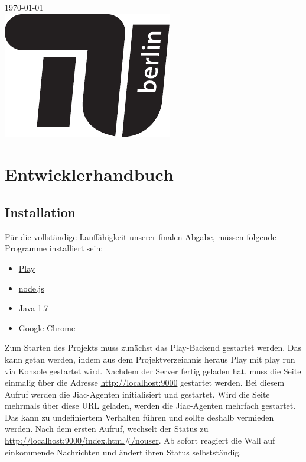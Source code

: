 \documentclass[10pt,a4paper]{report}
\newcommand{\code}[1]{{\fontfamily{cmvtt}\selectfont #1}}
\begin{document}
\begin{titlepage}

{\large \today}\\[3cm] %

\includegraphics{TU_Logo.pdf}\\[1cm] %

\vfill %
\end{titlepage}



\tableofcontents


\chapter{Entwicklerhandbuch}
	\section{Installation}
	Für die vollständige Lauffähigkeit unserer finalen Abgabe, müssen folgende Programme installiert sein:
	\begin{itemize}
		\item \href{http://www.playframework.com/}{Play}
		\item \href{http://nodejs.org/}{node.js} 
		\item \href{http://www.oracle.com/technetwork/java/javase/downloads/java-se-jre-7-download-432155.html}{Java 1.7} 
		\item \href{http://www.google.de/intl/de/chrome/browser/}{Google Chrome}
	\end{itemize}
	Zum Starten des Projekts muss zunächst das Play-Backend gestartet werden. Das kann getan werden, indem aus dem Projektverzeichnis heraus Play mit
	\code{play run} via Konsole gestartet wird. Nachdem der Server fertig geladen hat, muss die Seite einmalig über die Adresse \url{http://localhost:9000} gestartet werden.
	Bei diesem Aufruf werden die Jiac-Agenten initialisiert und gestartet. Wird die Seite mehrmals über diese URL geladen, werden die Jiac-Agenten mehrfach gestartet. Das kann zu undefiniertem Verhalten führen und sollte deshalb vermieden werden. Nach dem ersten Aufruf, wechselt der Status zu \url{http://localhost:9000/index.html\#/nouser}. Ab sofort reagiert die Wall auf einkommende Nachrichten und ändert ihren Status selbstständig.
\end{document}
